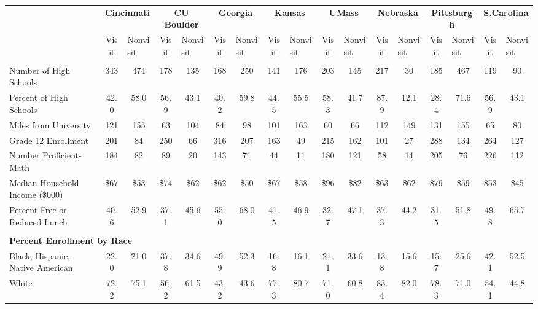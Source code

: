 \begin{tabular*}{\linewidth}{@{\extracolsep{\fill} } lcccccccccccccccc}%
&\multicolumn{2}{c}{\bfseries Cincinnati}&\multicolumn{2}{c}{\bfseries CU Boulder}&\multicolumn{2}{c}{\bfseries Georgia}&\multicolumn{2}{c}{\bfseries Kansas}&\multicolumn{2}{c}{\bfseries UMass}&\multicolumn{2}{c}{\bfseries Nebraska}&\multicolumn{2}{c}{\bfseries Pittsburgh}&\multicolumn{2}{c}{\bfseries S.Carolina}\\%
&Visit&\multicolumn{1}{l}{Nonvisit}&Visit&\multicolumn{1}{l}{Nonvisit}&Visit&\multicolumn{1}{l}{Nonvisit}&Visit&\multicolumn{1}{l}{Nonvisit}&Visit&\multicolumn{1}{l}{Nonvisit}&Visit&\multicolumn{1}{l}{Nonvisit}&Visit&\multicolumn{1}{l}{Nonvisit}&Visit&\multicolumn{1}{l}{Nonvisit}\\%
\hline%
&&&&&&&&&&&&&&&&\\%
\hspace{0cm}Number of High Schools&343&474&178&135&168&250&141&176&203&145&217&30&185&467&119&90\\%
Percent of High Schools&42.0&58.0&56.9&43.1&40.2&59.8&44.5&55.5&58.3&41.7&87.9&12.1&28.4&71.6&56.9&43.1\\%
\hspace{0cm}Miles from University&121&155&63&104&84&98&101&163&60&66&112&149&131&155&65&80\\%
\hspace{0cm}Grade 12 Enrollment&201&84&250&66&316&207&163&49&215&162&101&27&288&134&264&127\\%
\hspace{0cm}Number Proficient{-}Math&184&82&89&20&143&71&44&11&180&121&58&14&205&76&226&112\\%
\hspace{0cm}Median Household Income (\$000)&\$67&\$53&\$74&\$62&\$62&\$50&\$67&\$58&\$96&\$82&\$63&\$62&\$79&\$59&\$53&\$45\\%
\hspace{0cm}Percent Free or Reduced Lunch&40.6&52.9&37.1&45.6&55.0&68.0&41.5&46.9&32.7&47.1&37.3&44.2&31.5&51.8&49.8&65.7\\%
&&&&&&&&&&&&&&&&\\%
\multicolumn{17}{l}{\bfseries Percent Enrollment by Race}\\%
\hspace{0.2cm}Black, Hispanic, Native American&22.0&21.0&37.8&34.6&49.9&52.3&16.8&16.1&21.1&33.6&13.8&15.6&15.7&25.6&42.1&52.5\\%
\hspace{0.2cm}White&72.2&75.1&56.2&61.5&43.2&43.6&77.3&80.7&71.0&60.8&83.4&82.0&78.3&71.0&54.1&44.8\\%

\end{tabular*}
